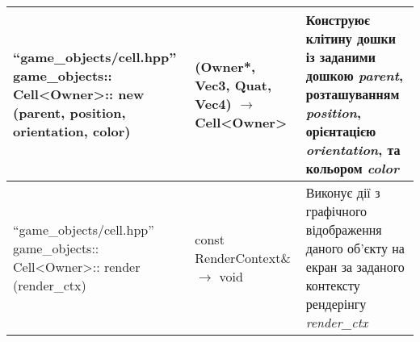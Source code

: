 {\begin{longtable}{| C{6cm} | C{4cm} | C{5cm} |}
    \hline
    ``game_objects/cell.hpp'' \newline game_objects:: \newline Cell<Owner>:: \newline
    new \newline (parent, position, orientation, color)
    & (Owner*, Vec3, Quat, Vec4) $\to$ Cell<Owner>
    & Конструює клітину дошки із заданими дошкою \emph{parent},
    розташуванням \emph{position},  орієнтацією \emph{orientation},
    та кольором \emph{color} \\
    \hline
    ``game_objects/cell.hpp'' \newline game_objects:: \newline Cell<Owner>:: \newline
    render \newline (render_ctx)
    & const RenderContext\& $\to$ void
    & Виконує дії з графічного відображення даного об'єкту на екран
      за заданого контексту рендерінгу \emph{render_ctx} \\

    \hline
  \end{longtable}
}